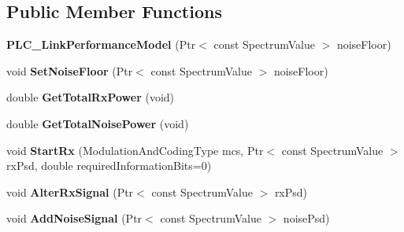 \subsection*{\-Public \-Member \-Functions}
\begin{DoxyCompactItemize}
\item 
\hypertarget{classns3_1_1PLC__LinkPerformanceModel_a68e2d733c273b6b6eb02c85d9f95187f}{{\bfseries \-P\-L\-C\-\_\-\-Link\-Performance\-Model} (\-Ptr$<$ const \-Spectrum\-Value $>$ noise\-Floor)}\label{classns3_1_1PLC__LinkPerformanceModel_a68e2d733c273b6b6eb02c85d9f95187f}

\item 
\hypertarget{classns3_1_1PLC__LinkPerformanceModel_a561ad30d6f8aafc990d44625de6fff0a}{void {\bfseries \-Set\-Noise\-Floor} (\-Ptr$<$ const \-Spectrum\-Value $>$ noise\-Floor)}\label{classns3_1_1PLC__LinkPerformanceModel_a561ad30d6f8aafc990d44625de6fff0a}

\item 
\hypertarget{classns3_1_1PLC__LinkPerformanceModel_acf1382a18105c5b80d6d1930f744580f}{double {\bfseries \-Get\-Total\-Rx\-Power} (void)}\label{classns3_1_1PLC__LinkPerformanceModel_acf1382a18105c5b80d6d1930f744580f}

\item 
\hypertarget{classns3_1_1PLC__LinkPerformanceModel_a24de3e14596295447cc1aaa3a5195f8b}{double {\bfseries \-Get\-Total\-Noise\-Power} (void)}\label{classns3_1_1PLC__LinkPerformanceModel_a24de3e14596295447cc1aaa3a5195f8b}

\item 
\hypertarget{classns3_1_1PLC__LinkPerformanceModel_a150ad47c334385a8e6b17be6745b704e}{void {\bfseries \-Start\-Rx} (\-Modulation\-And\-Coding\-Type mcs, \-Ptr$<$ const \-Spectrum\-Value $>$ rx\-Psd, double required\-Information\-Bits=0)}\label{classns3_1_1PLC__LinkPerformanceModel_a150ad47c334385a8e6b17be6745b704e}

\item 
\hypertarget{classns3_1_1PLC__LinkPerformanceModel_a7113925786b2ad9ebc4c36112b4ce642}{void {\bfseries \-Alter\-Rx\-Signal} (\-Ptr$<$ const \-Spectrum\-Value $>$ rx\-Psd)}\label{classns3_1_1PLC__LinkPerformanceModel_a7113925786b2ad9ebc4c36112b4ce642}

\item 
\hypertarget{classns3_1_1PLC__LinkPerformanceModel_a144e9bfde78d92976861615e4604c654}{void {\bfseries \-Add\-Noise\-Signal} (\-Ptr$<$ const \-Spectrum\-Value $>$ noise\-Psd)}\label{classns3_1_1PLC__LinkPerformanceModel_a144e9bfde78d92976861615e4604c654}


\end{DoxyCompactItemize}
